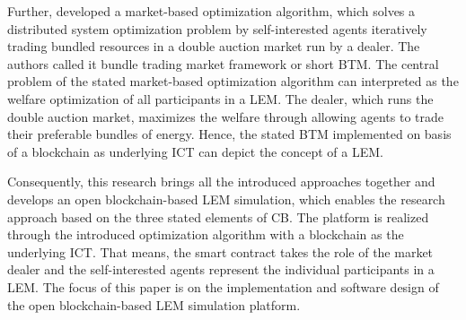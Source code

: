 Further,  developed a market-based optimization algorithm, which solves a distributed system optimization problem by self-interested agents iteratively trading bundled resources in a double auction market run by a dealer. The authors called it bundle trading market framework or short BTM. The central problem of the stated market-based optimization algorithm can interpreted as the welfare optimization of all participants in a LEM. The dealer, which runs the double auction market, maximizes the welfare through allowing agents to trade their preferable bundles of energy. Hence, the stated BTM implemented on basis of a blockchain as underlying ICT can depict the concept of a LEM.

Consequently, this research brings all the introduced approaches together and develops an open blockchain-based LEM simulation, which enables the research approach based on the three stated elements of CB. The platform is realized through the introduced optimization algorithm with a blockchain as the underlying ICT. That means, the smart contract takes the role of the market dealer and the self-interested agents represent the individual participants in a LEM. The focus of this paper is on the implementation and software design of the open blockchain-based LEM simulation platform.

\clearpage
